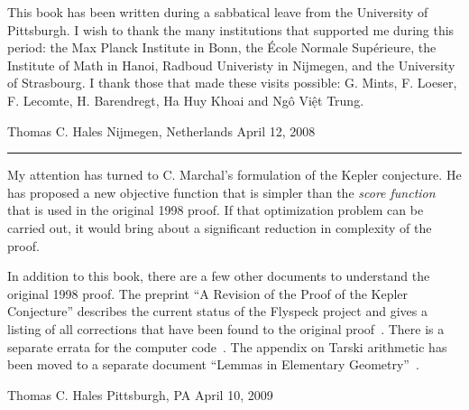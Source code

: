 This book has been written during a sabbatical leave from the University
of Pittsburgh.  I wish to thank the many institutions that supported
me during this period: the Max Planck Institute in Bonn, the \'Ecole Normale Sup\'erieure,  the Institute of Math
in Hanoi, Radboud Univeristy in Nijmegen, and the University of Strasbourg.
I thank those that made these visits possible: G. Mints, F. Loeser, F. Lecomte, H. Barendregt, Ha Huy Khoai and Ng\^o Vi\d{\^e}t Trung.


\bigskip
\hbox{}

{
\parindent=0pt
\obeylines

Thomas C. Hales
Nijmegen, Netherlands
April 12, 2008

}

\bigskip
\hrule
\bigskip

My attention has turned to C. Marchal's formulation of the Kepler conjecture.  He has proposed a new objective function that is simpler than the {\it score function} that is used in the original 1998 proof.  If that optimization problem can be carried out, it would bring about a significant reduction in complexity of the proof.

In addition to this book, there are a few other documents to understand the original 1998 proof.  The preprint ``A Revision of the Proof of the Kepler Conjecture'' describes the current status of the Flyspeck project and gives a listing of all corrections that have been found to the original proof~\cite{revision}.  There is a separate errata for the computer code~\cite{errata}.  The appendix on Tarski arithmetic has been moved to a separate document ``Lemmas in Elementary Geometry''~\cite{leg}.


\bigskip
\hbox{}

{
\parindent=0pt
\obeylines

Thomas C. Hales
Pittsburgh, PA
April 10, 2009

}








